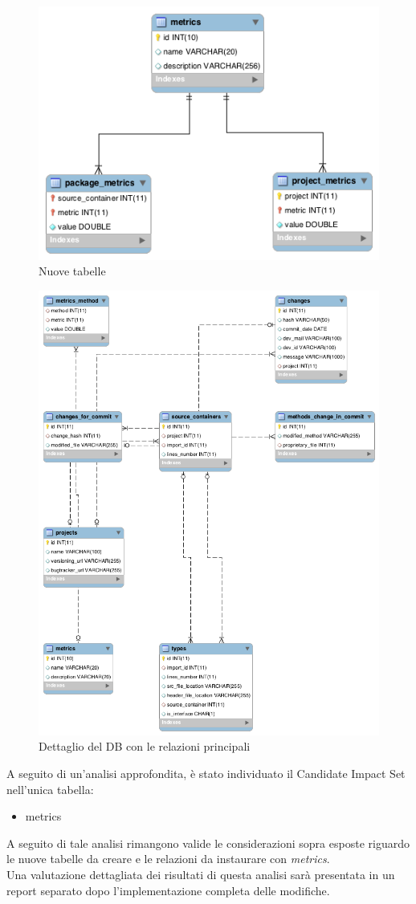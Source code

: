\begin{figure}[t]
	\centering
	\includegraphics[width=.5\textwidth]{img/dettaglio.png}
	\caption{Nuove tabelle}\label{fig:dettaglio}
\end{figure}

\begin{figure}[b]
	\centering
	\includegraphics[width=\textwidth]{img/sieImportant.png}
	\caption{Dettaglio del DB con le relazioni principali}\label{fig:sie}
\end{figure}

A seguito di un'analisi approfondita, è stato individuato il Candidate Impact Set nell'unica tabella: 
\begin{itemize}
\item metrics
\end{itemize}
A seguito di tale analisi rimangono valide le considerazioni sopra esposte riguardo le nuove tabelle da creare e le relazioni da instaurare con \textit{metrics}.
\\

Una valutazione dettagliata dei risultati di questa analisi sarà presentata in un report separato dopo l'implementazione completa delle modifiche.